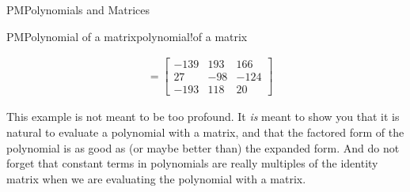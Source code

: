 \begin{subsect}{PM}{Polynomials and Matrices}
\begin{example}{PM}{Polynomial of a matrix}{polynomial!of a matrix}
\begin{para}
\begin{align*}
&=
\begin{bmatrix}
-139 & 193 & 166\\
27 & -98 & -124\\
-193 & 118 & 20
\end{bmatrix}
%
\end{align*}
\end{para}
%
\begin{para}This example is not meant to be too profound.  It {\em is} meant to show you that it is natural to evaluate a polynomial with a matrix, and that the factored form of the polynomial is as good as (or maybe better than) the expanded form.  And do not forget that constant terms in polynomials are really multiples of the identity matrix when we are evaluating the polynomial with a matrix.\end{para}
%
\end{example}
%
\end{subsect}
%
